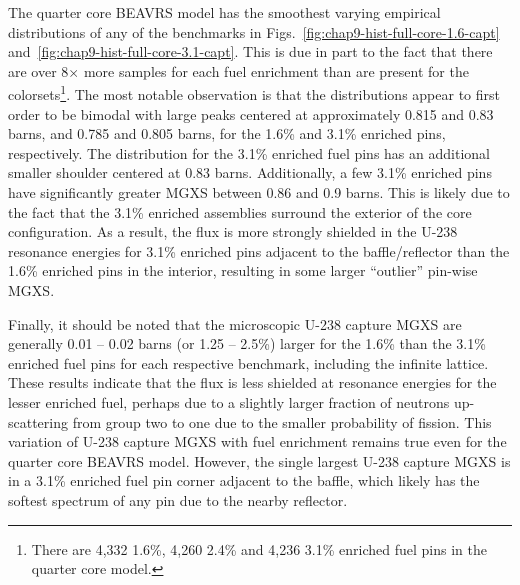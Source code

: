 The quarter core \ac{BEAVRS} model has the smoothest varying empirical distributions of any of the benchmarks in Figs.~\ref{fig:chap9-hist-full-core-1.6-capt} and~\ref{fig:chap9-hist-full-core-3.1-capt}. This is due in part to the fact that there are over 8$\times$ more samples for each fuel enrichment than are present for the colorsets\footnote{There are 4,332 1.6\%, 4,260 2.4\% and 4,236 3.1\% enriched fuel pins in the quarter core model.}. The most notable observation is that the distributions appear to first order to be bimodal with large peaks centered at approximately 0.815 and 0.83 barns, and 0.785 and 0.805 barns, for the 1.6\% and 3.1\% enriched pins, respectively. The distribution for the 3.1\% enriched fuel pins has an additional smaller shoulder centered at 0.83 barns. Additionally, a few 3.1\% enriched pins have significantly greater \ac{MGXS} between 0.86 and 0.9 barns. This is likely due to the fact that the 3.1\% enriched assemblies surround the exterior of the core configuration. As a result, the flux is more strongly shielded in the U-238 resonance energies for 3.1\% enriched pins adjacent to the baffle/reflector than the 1.6\% enriched pins in the interior, resulting in some larger ``outlier'' pin-wise \ac{MGXS}.

Finally, it should be noted that the microscopic U-238 capture \ac{MGXS} are generally 0.01 -- 0.02 barns (or 1.25 -- 2.5\%) larger for the 1.6\% than the 3.1\% enriched fuel pins for each respective benchmark, including the infinite lattice. These results indicate that the flux is less shielded at resonance energies for the lesser enriched fuel, perhaps due to a slightly larger fraction of neutrons up-scattering from group two to one due to the smaller probability of fission. This variation of U-238 capture \ac{MGXS} with fuel enrichment remains true even for the quarter core \ac{BEAVRS} model. However, the single largest U-238 capture \ac{MGXS} is in a 3.1\% enriched fuel pin corner adjacent to the baffle, which likely has the softest spectrum of any pin due to the nearby reflector.




